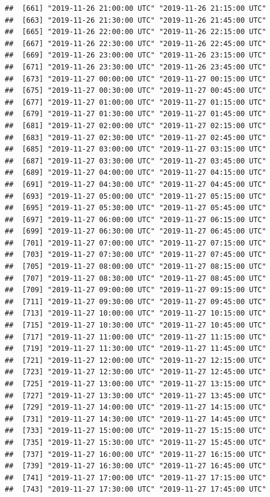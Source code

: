 \documentclass{article}\usepackage[]{graphicx}\usepackage[]{color}
\makeatletter
\newenvironment{kframe}{%
 \def\at@end@of@kframe{}%
 \ifinner\ifhmode%
  \def\at@end@of@kframe{\end{minipage}}%
  \begin{minipage}{\columnwidth}%
 \fi\fi%
 \def\FrameCommand##1{\hskip\@totalleftmargin \hskip-\fboxsep
 \colorbox{shadecolor}{##1}\hskip-\fboxsep
     \hskip-\linewidth \hskip-\@totalleftmargin \hskip\columnwidth}%
 \MakeFramed {\advance\hsize-\width
   \@totalleftmargin\z@ \linewidth\hsize
   \@setminipage}}%
 {\par\unskip\endMakeFramed%
 \at@end@of@kframe}
\newenvironment{knitrout}{}{} %
\makeatother
\begin{document}
\begin{knitrout}
\begin{kframe}
\begin{verbatim}
##  [661] "2019-11-26 21:00:00 UTC" "2019-11-26 21:15:00 UTC"
##  [663] "2019-11-26 21:30:00 UTC" "2019-11-26 21:45:00 UTC"
##  [665] "2019-11-26 22:00:00 UTC" "2019-11-26 22:15:00 UTC"
##  [667] "2019-11-26 22:30:00 UTC" "2019-11-26 22:45:00 UTC"
##  [669] "2019-11-26 23:00:00 UTC" "2019-11-26 23:15:00 UTC"
##  [671] "2019-11-26 23:30:00 UTC" "2019-11-26 23:45:00 UTC"
##  [673] "2019-11-27 00:00:00 UTC" "2019-11-27 00:15:00 UTC"
##  [675] "2019-11-27 00:30:00 UTC" "2019-11-27 00:45:00 UTC"
##  [677] "2019-11-27 01:00:00 UTC" "2019-11-27 01:15:00 UTC"
##  [679] "2019-11-27 01:30:00 UTC" "2019-11-27 01:45:00 UTC"
##  [681] "2019-11-27 02:00:00 UTC" "2019-11-27 02:15:00 UTC"
##  [683] "2019-11-27 02:30:00 UTC" "2019-11-27 02:45:00 UTC"
##  [685] "2019-11-27 03:00:00 UTC" "2019-11-27 03:15:00 UTC"
##  [687] "2019-11-27 03:30:00 UTC" "2019-11-27 03:45:00 UTC"
##  [689] "2019-11-27 04:00:00 UTC" "2019-11-27 04:15:00 UTC"
##  [691] "2019-11-27 04:30:00 UTC" "2019-11-27 04:45:00 UTC"
##  [693] "2019-11-27 05:00:00 UTC" "2019-11-27 05:15:00 UTC"
##  [695] "2019-11-27 05:30:00 UTC" "2019-11-27 05:45:00 UTC"
##  [697] "2019-11-27 06:00:00 UTC" "2019-11-27 06:15:00 UTC"
##  [699] "2019-11-27 06:30:00 UTC" "2019-11-27 06:45:00 UTC"
##  [701] "2019-11-27 07:00:00 UTC" "2019-11-27 07:15:00 UTC"
##  [703] "2019-11-27 07:30:00 UTC" "2019-11-27 07:45:00 UTC"
##  [705] "2019-11-27 08:00:00 UTC" "2019-11-27 08:15:00 UTC"
##  [707] "2019-11-27 08:30:00 UTC" "2019-11-27 08:45:00 UTC"
##  [709] "2019-11-27 09:00:00 UTC" "2019-11-27 09:15:00 UTC"
##  [711] "2019-11-27 09:30:00 UTC" "2019-11-27 09:45:00 UTC"
##  [713] "2019-11-27 10:00:00 UTC" "2019-11-27 10:15:00 UTC"
##  [715] "2019-11-27 10:30:00 UTC" "2019-11-27 10:45:00 UTC"
##  [717] "2019-11-27 11:00:00 UTC" "2019-11-27 11:15:00 UTC"
##  [719] "2019-11-27 11:30:00 UTC" "2019-11-27 11:45:00 UTC"
##  [721] "2019-11-27 12:00:00 UTC" "2019-11-27 12:15:00 UTC"
##  [723] "2019-11-27 12:30:00 UTC" "2019-11-27 12:45:00 UTC"
##  [725] "2019-11-27 13:00:00 UTC" "2019-11-27 13:15:00 UTC"
##  [727] "2019-11-27 13:30:00 UTC" "2019-11-27 13:45:00 UTC"
##  [729] "2019-11-27 14:00:00 UTC" "2019-11-27 14:15:00 UTC"
##  [731] "2019-11-27 14:30:00 UTC" "2019-11-27 14:45:00 UTC"
##  [733] "2019-11-27 15:00:00 UTC" "2019-11-27 15:15:00 UTC"
##  [735] "2019-11-27 15:30:00 UTC" "2019-11-27 15:45:00 UTC"
##  [737] "2019-11-27 16:00:00 UTC" "2019-11-27 16:15:00 UTC"
##  [739] "2019-11-27 16:30:00 UTC" "2019-11-27 16:45:00 UTC"
##  [741] "2019-11-27 17:00:00 UTC" "2019-11-27 17:15:00 UTC"
##  [743] "2019-11-27 17:30:00 UTC" "2019-11-27 17:45:00 UTC"

\end{verbatim}
\end{kframe}
\end{knitrout}
\end{document}
